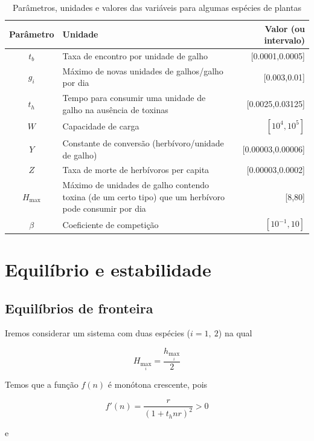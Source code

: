 \documentclass{article}
\begin{document}
\begin{table}[h!]
    \begin{tabular}{|c|p{9cm}|r|} \hline
    Parâmetro  & Unidade & Valor (ou intervalo) \\ \hline
    $t_b$ & Taxa de encontro por unidade de galho & [0.0001,0.0005] \\
    $g_i$ & Máximo de novas unidades de galhos/galho por dia & [0.003,0.01] \\
    $t_h$ & Tempo para consumir uma unidade de galho na ausência de toxinas & [0.0025,0.03125] \\
    $W$ & Capacidade de carga & $[10^4,10^5]$ \\
    $Y$ & Constante de conversão (herbívoro/unidade de galho) & [0.00003,0.00006] \\
    $Z$ & Taxa de morte de herbívoros per capita &  [0.00003,0.0002] \\
    $H_{\max}$ & Máximo de unidades de galho contendo toxina (de um certo tipo) que um herbívoro pode consumir por dia & [8,80] \\
    $\beta$ & Coeficiente de competição & $[10^{-1},10]$ \\ \hline
    \end{tabular}
    \caption{Parâmetros, unidades e valores das variáveis para algumas espécies de plantas}
    \label{tab:my_label}
\end{table}

\newpage

\section{Equilíbrio e estabilidade}

\subsection{Equilíbrios de fronteira}

Iremos considerar um sistema com duas espécies ($i = 1,\:2$) na qual

\begin{equation}
    H_{\max_i} = \frac{h_{\max_i}}{2}
\end{equation}

Temos que a função $f(n)$ é monótona crescente, pois

\begin{equation*}
    f'(n) = \frac{r}{(1 + t_hnr)^2} > 0
\end{equation*}

e
\end{document}
